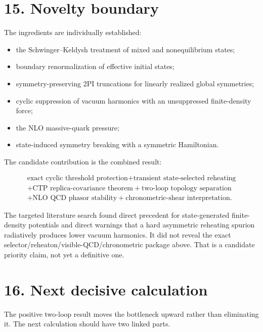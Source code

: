 \documentclass[
  10pt,
  a4paper,
]{article}
\providecommand{\tightlist}{%
  \setlength{\itemsep}{0pt}\setlength{\parskip}{0pt}}
\begin{document}
\section{15. Novelty boundary}\label{novelty-boundary}

The ingredients are individually established:

\begin{itemize}
\tightlist
\item
  the Schwinger--Keldysh treatment of mixed and nonequilibrium states;
\item
  boundary renormalization of effective initial states;
\item
  symmetry-preserving 2PI truncations for linearly realized global
  symmetries;
\item
  cyclic suppression of vacuum harmonics with an unsuppressed
  finite-density force;
\item
  the NLO massive-quark pressure;
\item
  state-induced symmetry breaking with a symmetric Hamiltonian.
\end{itemize}

The candidate contribution is the combined result:

\[
\boxed{
\begin{gathered}
\text{exact cyclic threshold protection}
+
\text{transient state-selected reheating}
\\
+
\text{CTP replica-covariance theorem}
+
\text{two-loop topology separation}
\\
+
\text{NLO QCD phasor stability}
+
\text{chronometric-shear interpretation}.
\end{gathered}
}
\]

The targeted literature search found direct precedent for
state-generated finite-density potentials and direct warnings that a
hard asymmetric reheating spurion radiatively produces lower vacuum
harmonics. It did not reveal the exact
selector/reheaton/visible-QCD/chronometric package above. That is a
candidate priority claim, not yet a definitive one.

\section{16. Next decisive calculation}\label{next-decisive-calculation}

The positive two-loop result moves the bottleneck upward rather than
eliminating it. The next calculation should have two linked parts.
\end{document}
